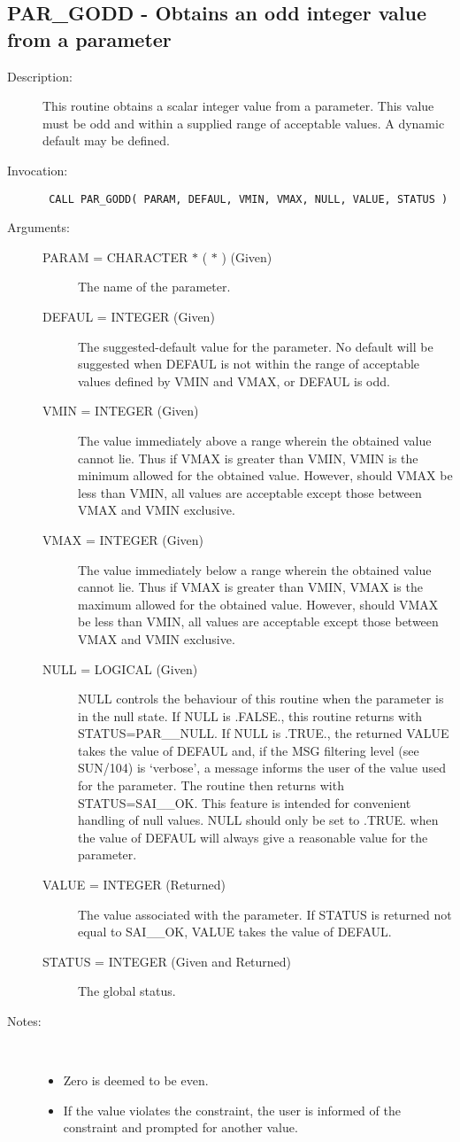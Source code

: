 \documentclass[twoside,11pt]{article}
\newcommand{\xref}[3]{#1}
\newcommand{\xlabel}[1]{}
\newcommand{\latex}[1]{#1}
\newlength{\sstbannerlength}
\newlength{\sstcaptionlength}
\newlength{\sstexampleslength}
\newlength{\sstexampleswidth}
\newcommand{\sstroutine}[3]{
   \goodbreak
   \rule{\textwidth}{0.5mm}
   \vspace{-7ex}
   \newline
   \settowidth{\sstbannerlength}{{\Large {\bf #1}}}
   \setlength{\sstcaptionlength}{\textwidth}
   \setlength{\sstexampleslength}{\textwidth}
   \addtolength{\sstbannerlength}{0.5em}
   \addtolength{\sstcaptionlength}{-2.0\sstbannerlength}
   \addtolength{\sstcaptionlength}{-5.0pt}
   \settowidth{\sstexampleswidth}{{\bf Examples:}}
   \addtolength{\sstexampleslength}{-\sstexampleswidth}
   \parbox[t]{\sstbannerlength}{\flushleft{\Large {\bf #1}}}
   \parbox[t]{\sstcaptionlength}{\center{\Large #2}}
   \parbox[t]{\sstbannerlength}{\flushright{\Large {\bf #1}}}
   \begin{description}
      #3
   \end{description}
}
\newcommand{\sstdescription}[1]{\item[Description:] #1}
\newcommand{\sstinvocation}[1]{\item[Invocation:]\hspace{0.4em}{\tt #1}}
\newcommand{\sstarguments}[1]{
   \item[Arguments:] \mbox{} \\
   \vspace{-3.5ex}
   \begin{description}
      #1
   \end{description}
}
\newcommand{\sstsubsection}[1]{ \item[{#1}] \mbox{} \\}
\newcommand{\sstnotes}[1]{\item[Notes:] \mbox{} \\[1.3ex] #1}
\newcommand{\sstitemlist}[1]{
  \mbox{} \\
  \vspace{-7ex}
  \begin{itemize}
     #1
  \end{itemize}
}
\newcommand{\sstitem}{\item}
\newcommand{\ssttt}{\tt}
\renewcommand{\sstroutine}[3]{
      \subsection{\xlabel{12}#1\xlabel{#1}-\label{#1}#2}
      \begin{description}
         #3
      \end{description}
   }
\renewcommand{\sstdescription}[1]{\item[Description:]
      \begin{description}
         #1
      \end{description}
   }
\renewcommand{\sstinvocation}[1]{\item[Invocation:]
      \begin{description}
         {\ssttt #1}
      \end{description}
   }
\renewcommand{\sstarguments}[1]{
      \item[Arguments:]
      \begin{description}
         #1
      \end{description}
   }
\renewcommand{\sstsubsection}[1]{\item[{#1}]}
\renewcommand{\sstnotes}[1]{\item[Notes:]
      \begin{description}
         #1
      \end{description}
   }
\newcommand{\sstitemlist}[1]{
      \begin{itemize}
         #1
      \end{itemize}
   }
\begin{document}
\sstroutine{
   PAR\_GODD
}{
   Obtains an odd integer value from a parameter
}{
   \sstdescription{
      This routine obtains a scalar integer value from a parameter.
      This value must be odd and within a supplied range of acceptable
      values.  A dynamic default may be defined.
   }
   \sstinvocation{
      CALL PAR\_GODD( PARAM, DEFAUL, VMIN, VMAX, NULL, VALUE, STATUS )
   }
   \sstarguments{
      \sstsubsection{
         PARAM = CHARACTER $*$ ( $*$ ) (Given)
      }{
         The name of the parameter.
      }
      \sstsubsection{
         DEFAUL = INTEGER (Given)
      }{
         The suggested-default value for the parameter.  No default
         will be suggested when DEFAUL is not within the range of
         acceptable values defined by VMIN and VMAX, or DEFAUL is odd.
      }
      \sstsubsection{
         VMIN = INTEGER (Given)
      }{
         The value immediately above a range wherein the obtained
         value cannot lie.  Thus if VMAX is greater than VMIN, VMIN
         is the minimum allowed for the obtained value.  However,
         should VMAX be less than VMIN, all values are acceptable
         except those between VMAX and VMIN exclusive.
      }
      \sstsubsection{
         VMAX = INTEGER (Given)
      }{
         The value immediately below a range wherein the obtained
         value cannot lie.  Thus if VMAX is greater than VMIN, VMAX
         is the maximum allowed for the obtained value.  However,
         should VMAX be less than VMIN, all values are acceptable
         except those between VMAX and VMIN exclusive.
      }
      \sstsubsection{
         NULL = LOGICAL (Given)
      }{
         NULL controls the behaviour of this routine when the parameter
         is in the null state.  If NULL is .FALSE., this routine
         returns with STATUS=PAR\_\_NULL.  If NULL is .TRUE., the
         returned VALUE takes the value of DEFAUL and, if the
\xref{MSG filtering level}{sun104}{conditional_message_reporting}
\latex{ (see SUN/104)} is `verbose',
         a message informs the user of the value used for
         the parameter. The routine then returns with STATUS=SAI\_\_OK. 
         This feature is intended for convenient handling of null values.
         NULL should only be set to .TRUE. when the value of DEFAUL will
         always give a reasonable value for the parameter.
      }
      \sstsubsection{
         VALUE  = INTEGER (Returned)
      }{
         The value associated with the parameter.  If STATUS is returned
         not equal to SAI\_\_OK, VALUE takes the value of DEFAUL.
      }
      \sstsubsection{
         STATUS = INTEGER (Given and Returned)
      }{
         The global status.
      }
   }
   \sstnotes{
      \sstitemlist{

         \sstitem
         Zero is deemed to be even.

         \sstitem
         If the value violates the constraint, the user is informed of
         the constraint and prompted for another value.
      }
   }
}
\end{document}

